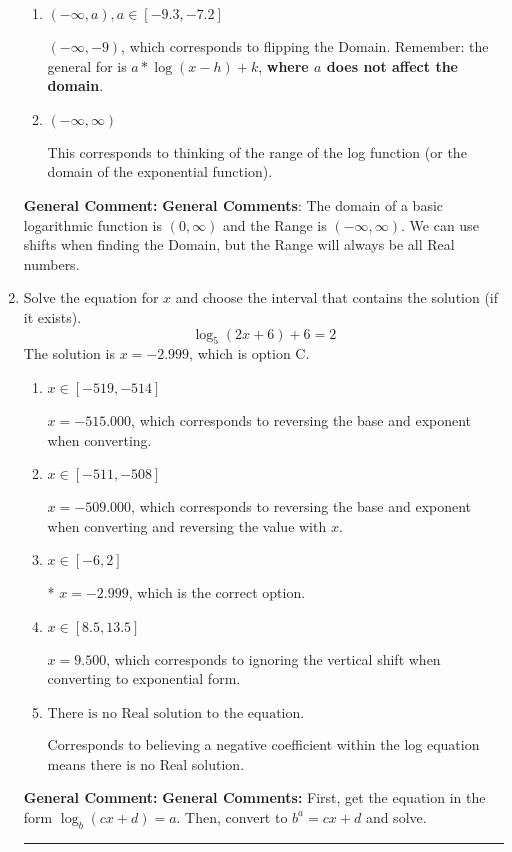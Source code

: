 \documentclass{extbook}[14pt]
\newcommand{\litem}[1]{\item #1

\rule{\textwidth}{0.4pt}}
\begin{document}
\begin{enumerate}
{\begin{enumerate}[label=\Alph*.]
* $(9, \infty)$, which is the correct option.
\item \( (-\infty, a), a \in [-9.3, -7.2] \)

$(-\infty, -9)$, which corresponds to flipping the Domain. Remember: the general for is $a*\log(x-h)+k$, \textbf{where $a$ does not affect the domain}.
\item \( (-\infty, \infty) \)

This corresponds to thinking of the range of the log function (or the domain of the exponential function).
\end{enumerate}

\textbf{General Comment:} \textbf{General Comments}: The domain of a basic logarithmic function is $(0, \infty)$ and the Range is $(-\infty, \infty)$. We can use shifts when finding the Domain, but the Range will always be all Real numbers.
}
\litem{
Solve the equation for $x$ and choose the interval that contains the solution (if it exists).
\[ \log_{5}{(2x+6)}+6 = 2 \]
The solution is \( x = -2.999 \), which is option C.\begin{enumerate}[label=\Alph*.]
\item \( x \in [-519, -514] \)

$x = -515.000$, which corresponds to reversing the base and exponent when converting.
\item \( x \in [-511, -508] \)

$x = -509.000$, which corresponds to reversing the base and exponent when converting and reversing the value with $x$.
\item \( x \in [-6, 2] \)

* $x = -2.999$, which is the correct option.
\item \( x \in [8.5, 13.5] \)

$x = 9.500$, which corresponds to ignoring the vertical shift when converting to exponential form.
\item \( \text{There is no Real solution to the equation.} \)

Corresponds to believing a negative coefficient within the log equation means there is no Real solution.
\end{enumerate}

\textbf{General Comment:} \textbf{General Comments:} First, get the equation in the form $\log_b{(cx+d)} = a$. Then, convert to $b^a = cx+d$ and solve.
}
\end{enumerate}
\end{document}
